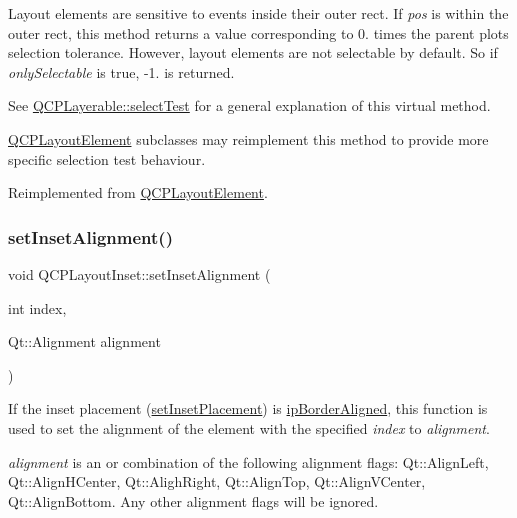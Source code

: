 Layout elements are sensitive to events inside their outer rect. If {\itshape pos} is within the outer rect, this method returns a value corresponding to 0. times the parent plot\textquotesingle{}s selection tolerance. However, layout elements are not selectable by default. So if {\itshape only\+Selectable} is true, -\/1. is returned.

See \hyperlink{class_q_c_p_layerable_a04db8351fefd44cfdb77958e75c6288e}{Q\+C\+P\+Layerable\+::select\+Test} for a general explanation of this virtual method.

\hyperlink{class_q_c_p_layout_element}{Q\+C\+P\+Layout\+Element} subclasses may reimplement this method to provide more specific selection test behaviour. 

Reimplemented from \hyperlink{class_q_c_p_layout_element_ae97f483cccedadbf18ea4525ef240ee4}{Q\+C\+P\+Layout\+Element}.

\mbox{\label{class_q_c_p_layout_inset_a62882a4f9ad58bb0f53da12fde022abe}} 
\subsubsection{\texorpdfstring{set\+Inset\+Alignment()}{setInsetAlignment()}}
{\footnotesize\ttfamily void Q\+C\+P\+Layout\+Inset\+::set\+Inset\+Alignment (\begin{DoxyParamCaption}\item[{int}]{index,  }\item[{Qt\+::\+Alignment}]{alignment }\end{DoxyParamCaption})}

If the inset placement (\hyperlink{class_q_c_p_layout_inset_a63298830744d5d8c5345511c00fd2144}{set\+Inset\+Placement}) is \hyperlink{class_q_c_p_layout_inset_a8b9e17d9a2768293d2a7d72f5e298192a41ae236f04e42d7098e09fd49dffeb06}{ip\+Border\+Aligned}, this function is used to set the alignment of the element with the specified {\itshape index} to {\itshape alignment}.

{\itshape alignment} is an or combination of the following alignment flags\+: Qt\+::\+Align\+Left, Qt\+::\+Align\+H\+Center, Qt\+::\+Aligh\+Right, Qt\+::\+Align\+Top, Qt\+::\+Align\+V\+Center, Qt\+::\+Align\+Bottom. Any other alignment flags will be ignored. \mbox{\label{class_q_c_p_layout_inset_a63298830744d5d8c5345511c00fd2144}} 
